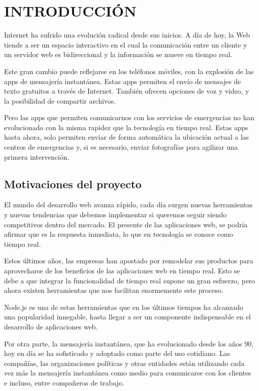 \chapter{INTRODUCCIÓN}

Internet ha sufrido una evolución radical desde sus inicios. A día de hoy, la Web tiende a ser un espacio interactivo en el cual la comunicación entre un cliente y un servidor web es bidireccional y la información se mueve en tiempo real.

Este gran cambio puede reflejarse en los teléfonos móviles, con la explosión de las apps de mensajería instantánea. Estas apps permiten el envío de mensajes de texto gratuitos a través de Internet. También ofrecen opciones de voz y video, y la posibilidad de compartir archivos.

Pero las apps que permiten comunicarnos con los servicios de emergencias no han evolucionado con la misma rapidez que la tecnología en tiempo real. Estas apps hasta ahora, solo permiten enviar de forma automática la ubicación actual a las centros de emergencias y, si es necesario, enviar fotografías para agilizar una primera intervención.

\clearpage

\section{Motivaciones del proyecto}

El mundo del desarrollo web avanza rápido, cada día surgen nuevas herramientas y nuevas tendencias que debemos implementar si queremos seguir siendo competitivos dentro del mercado. El presente de las aplicaciones web, se podría afirmar que es la respuesta inmediata, lo que en tecnología se conoce como tiempo real.

Estos últimos años, las empresas han apostado por remodelar sus productos para aprovecharse de los beneficios de las aplicaciones web en tiempo real. Esto se debe a que integrar la funcionalidad de tiempo real supone un gran esfuerzo, pero ahora existen herramientas que nos facilitan enormemente este proceso.

Node.js es una de estas herramientas que en los últimos tiempos ha alcanzado una popularidad innegable, hasta llegar a ser un componente indispensable en el desarrollo de aplicaciones web.

Por otra parte, la mensajería instantánea, que ha evolucionado desde los años 90, hoy en día se ha sofisticado y adoptado como parte del uso cotidiano. Las compañías, las organizaciones políticas y otras entidades están utilizando cada vez más la mensajería instantánea como medio para comunicarse con los clientes e incluso, entre compañeros de trabajo.

